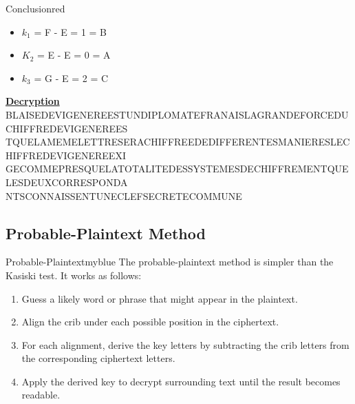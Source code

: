 \vspace{0.7cm}

\begin{prettyBox}{Conclusion}{red}

    \begin{itemize}
        \item \(k_1\) = F - E = 1 = B
        \item \(K_2\) = E - E = 0 = A
        \item \(k_3\) = G - E = 2 = C
    \end{itemize}

\begin{center}
\end{center}
\end{prettyBox}

\newpage
\textbf{\underline{Decryption}}\\[0.25cm]
BLAISEDEVIGENEREESTUNDIPLOMATEFRANAISLAGRANDEFORCEDUCHIFFREDEVIGENEREES\\
TQUELAMEMELETTRESERACHIFFREEDEDIFFERENTESMANIERESLECHIFFREDEVIGENEREEXI\\
GECOMMEPRESQUELATOTALITEDESSYSTEMESDECHIFFREMENTQUELESDEUXCORRESPONDA\\
NTSCONNAISSENTUNECLEFSECRETECOMMUNE

\vspace{1.25cm}

\subsection{Probable-Plaintext Method}

\begin{prettyBox}{Probable-Plaintext}{myblue}
The probable-plaintext method is simpler than the Kasiski test. It works as follows:
\begin{enumerate}
  \item Guess a likely word or phrase that might appear in the plaintext.
  \item Align the crib under each possible position in the ciphertext.
  \item For each alignment, derive the key letters by subtracting the crib letters from the corresponding ciphertext letters.
  \item Apply the derived key to decrypt surrounding text until the result becomes readable.
\end{enumerate}
\end{prettyBox}

